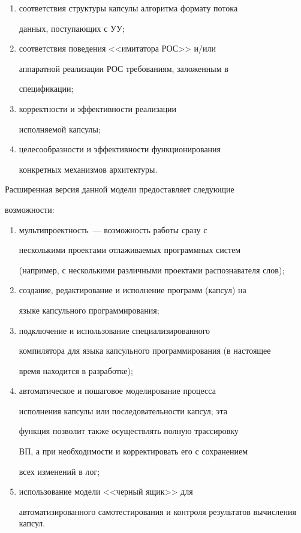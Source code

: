    \begin{enumerate}[(1)]


   \item соответствия структуры капсулы алгоритма формату потока 


данных, поступающих с  УУ;


   \item соответствия поведения  <<имитатора РОС>> и/или 


аппаратной реализации РОС требованиям, заложенным в 


спецификации;


  \item корректности и эффективности реализации 


исполняемой капсулы;


   \item целесообразности и  эффективности функционирования 


конкретных механизмов архитектуры.


   \end{enumerate}


   


   Расширенная версия данной  модели предоставляет следующие 


возможности:


   \begin{enumerate}[(1)]


   \item мультипроектность~--- возможность работы сразу с 


несколькими проектами отлаживаемых программных систем 


(например, с несколькими  различными проектами  распознавателя слов);


   \item создание, редактирование и исполнение программ (капсул) на 


языке кап\-суль\-но\-го программирования;


   \item подключение и  использование специализированного 


компилятора для языка капсульного  программирования (в настоящее 


время находится в разработке);


   \item автоматическое и пошаговое моделирование процесса 


исполнения капсулы или последовательности капсул; эта 


функция позволит также осуществлять полную трассировку 


ВП, а при необходимости и  корректировать его с сохранением 


всех изменений в лог;


   \item использование модели  <<черный ящик>> для 


автоматизированного самотестирования и контроля  результатов вычисления капсул.


   \end{enumerate}


